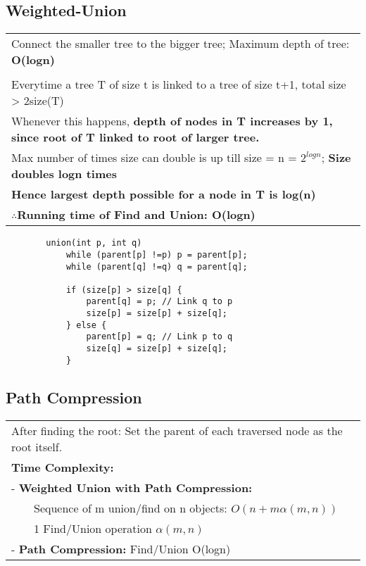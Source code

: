 \documentclass{article}
\newcommand{\tabitem}{~~\llap{\textbullet}~~}
\begin{document}
    \pagebreak

    \subsection{Weighted-Union}

    \begin{tabular}{l}
        Connect the smaller tree to the bigger tree; Maximum depth of tree: \textbf{O(logn)}\\\\
        Everytime a tree T of size t is linked to a tree of size t+1, total size > 2size(T)\\
        Whenever this happens, \textbf{depth of nodes in T increases by 1, since root of T linked to root of larger tree.}\\
        Max number of times size can double is up till size = n = $2^{logn}$; \textbf{Size doubles logn times}\\
        \textbf{Hence largest depth possible for a node in T is log(n)}\\
        $\therefore $\textbf{Running time of Find and Union: O(logn)}\\
    \end{tabular}

    \begin{verbatim}
        union(int p, int q)
            while (parent[p] !=p) p = parent[p];
            while (parent[q] !=q) q = parent[q];
            
            if (size[p] > size[q] {
                parent[q] = p; // Link q to p
                size[p] = size[p] + size[q];
            } else {
                parent[p] = q; // Link p to q
                size[q] = size[p] + size[q];
            }
    \end{verbatim}

    \subsection{Path Compression}

    \begin{tabular}{l}
        After finding the root: Set the parent of each traversed node as the root itself.\\
        \textbf{Time Complexity:} \\
        - \textbf{Weighted Union with Path Compression:} \\
        \tabitem Sequence of m union/find on n objects: $O(n + m\alpha(m,n))$\\
        \tabitem 1 Find/Union operation $\alpha(m,n)$\\
        - \textbf{Path Compression:} Find/Union O(logn)\\
    \end{tabular}   
    
\end{document}
